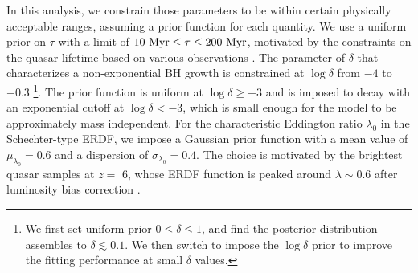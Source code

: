 \documentclass[twocolumn, twocolappendix]{aastex63}
\newcommand{\tlife}{\tau}
\newcommand{\red}[1]{\textcolor{red}{ #1}}
\newcommand{\blue}[1]{\textcolor{blue}{ #1}}
\begin{document}
\begin{CJK*}{UTF8}{gbsn}
In this analysis, we constrain those parameters to be within certain physically acceptable ranges, 
assuming a prior function for each quantity.
We use a uniform prior on $\tlife$ with a limit of $10~{\rm Myr} \leq \tlife \leq 200~{\rm Myr}$,
motivated by the constraints on the quasar lifetime based on various observations
\citep[e.g.,][]{2004cbhg.symp..169M}.
The parameter of $\delta$ that characterizes a non-exponential BH growth 
is constrained at $\log \delta$ from $-4$ to $-0.3$
\footnote[2]{ We first set uniform prior $0\leq \delta \leq 1$, 
and find the posterior distribution assembles to $\delta \lesssim 0.1$.
We then switch to impose the $\log \delta$ prior to improve the fitting performance at small $\delta$ values.}.
The prior function is uniform at $\log \delta \geq -3$ and is imposed to decay with an exponential cutoff at $\log \delta < -3$,
which is small enough for the model to be approximately mass independent.
For the characteristic Eddington ratio $\lambda_0$ in the Schechter-type ERDF, 
we impose a Gaussian prior function with a mean value of $\mu_{\lambda_0}=0.6$ and a dispersion of $\sigma_{\lambda_0}=0.4$.
The choice is motivated by the brightest quasar samples at $z=$ 6, whose ERDF function is peaked around $\lambda \sim 0.6$ 
after luminosity bias correction \citep[e.g.,][]{2010AJ....140..546W}.

\end{CJK*}
\end{document}
